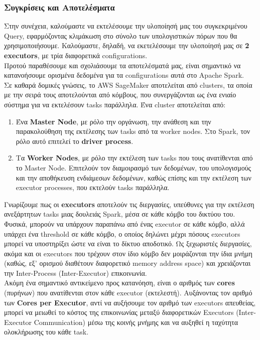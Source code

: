 \documentclass{article}
\begin{document}
\subsubsection*{ Συγκρίσεις και Αποτελέσματα}
Στην συνέχεια, καλούμαστε να εκτελέσουμε την υλοποίησή μας του συγκεκριμένου Query, εφαρμόζοντας κλιμάκωση στο σύνολο των υπολογιστικών πόρων που θα χρησιμοποιήσουμε. Καλούμαστε, δηλαδή, να εκετελέσουμε την υλοποίησή μας σε \textbf{2 executors}, με τρία διαφορετικά configurations. \\
Προτού παραθέσουμε και σχολιάσουμε τα αποτελέσματά μας, είναι σημαντικό να κατανοήσουμε ορισμένα δεδομένα για τα configurations αυτά στο Apache Spark. \\
Σε καθαρά δομικές γνώσεις, το AWS SageMaker αποτελείται από clusters, τα οποία με την σειρά τους αποτελούνται από κόμβους, που συνεργάζονται ως ένα ενιαίο σύστημα για να εκτελέσουν tasks παράλληλα. Ένα cluster αποτελείται από:
\begin{enumerate}
	\item  Ένα \textbf{Master Node}, με ρόλο την οργάνωση, την ανάθεση και την παρακολούθηση της εκτέλεσης των tasks από τα worker nodes. Στο Spark, τον ρόλο αυτό επιτελεί το \textbf{driver process}. 
	\item Τα \textbf{Worker Nodes}, με ρόλο την εκτέλεση των tasks που τους ανατίθενται από το Master Node. Επιτελούν τον διαμοιρασμό των δεδομένων, του υπολογισμούς και την αποθήκευση ενδιάμεσων δεδομένων, καθώς επίσης και την εκτέλεση των executor processes, που εκτελούν tasks παράλληλα. 
\end{enumerate}
Γνωρίζουμε πως οι \textbf{executors} αποτελούν τις διεργασίες, υπεύθυνες για την εκτέλεση ανεξάρτητων tasks μιας δουλειάς Spark, μέσα σε κάθε κόμβο του δικτύου του. Φυσικά, μπορούν να υπάρχουν παραπάνω από ένας executor σε κάθε κόμβο, αλλά υπάρχει ένα threshold σε κάθε κόμβο, ο οποίος δηλώνει μέχρι πόσους executors μπορεί να υποστηρίξει ώστε να είναι το δίκτυο αποδοτικό. Ως ξεχωριστές διεργασίες, ακόμα και οι executors που τρέχουν στον ίδιο κόμβο δεν μοιράζονται την ίδια μνήμη (καθώς, εξ' ορισμού διαθέτουν διαφορετικό memory address space) και χρειάζονται την Inter-Process (Inter-Executor) επικοινωνία. \\
Ακόμη ένα σημαντικό αντικείμενο προς κατανόηση, είναι ο αριθμός των \textbf{cores} (πυρήνων) που ανατίθενται στον κάθε executor (εκτελεστή). Αυξάνοντας τον αριθμό των \textbf{Cores per Executor}, αντί να αυξήσουμε τον αριθμό των executors απευθείας, μπορεί να μειωθεί το κόστος της επικοινωνίας μεταξύ διαφορετικών Executors (Inter-Executor Communication) μέσω της κοινής μνήμης και να αυξηθεί η ταχύτητα ολοκλήρωσης του κάθε task. \\
\end{document}
